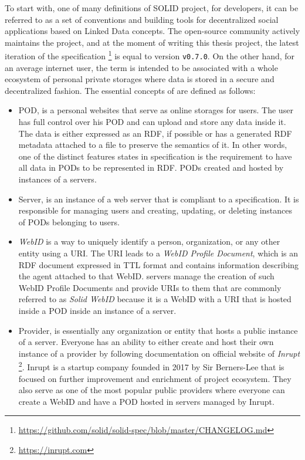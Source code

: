 To start with, one of many definitions of SOLID project, for developers, it can be referred to as a set of conventions and building tools for decentralized social applications based on Linked Data concepts. The open-source community actively maintains the project, and at the moment of writing this thesis project, the latest iteration of the specification \footnote{\url{https://github.com/solid/solid-spec/blob/master/CHANGELOG.md}} is equal to version \texttt{v0.7.0}. On the other hand, for an average internet user, the term \solid{} is intended to be associated with a whole ecosystem of personal private storages where data is stored in a secure and decentralized fashion. The essential concepts of \solid{} are defined as follows:
\begin{itemize}
    \item \solid{} \gls{POD}, is a personal websites  that serve as online storages  for users. The user has full control over his POD and can upload and store any data inside it. The data is either expressed as an RDF, if possible or has a generated RDF metadata attached to a file to preserve the semantics of it. In other words, one of the distinct features states in \solid{} specification is the requirement to have all data in PODs to be represented in RDF. PODs created and hosted by instances of a \solid{} servers.
    \item \solid{} Server, is an instance of a web server that is compliant to a \solid{} specification. It is responsible for managing users and creating, updating, or deleting instances of PODs belonging to users.
    \item \textit{WebID}  is a way to uniquely identify a person, organization, or any other entity using a URI. The URI leads to a \textit{WebID Profile Document}, which is an RDF document expressed in TTL format and contains information describing the agent attached to that WebID. \solid{} servers manage the creation of such WebID Profile Documents and provide URIs to them that are commonly referred to as \textit{Solid WebID} because it is a WebID with a URI that is hosted inside a POD inside an instance of a \solid{} server.
    \item \solid{} Provider, is essentially any organization or entity that hosts a public instance of a \solid{} server. Everyone has an ability to either create and host their own instance of a \solid{} provider  by following documentation on official website of \textit{Inrupt} \footnote{\url{https://inrupt.com}}. Inrupt is a startup company founded in 2017 by Sir Berners-Lee that is focused on further improvement and enrichment of \solid{} project ecosystem. They also serve as one of the most popular public \solid{} providers where everyone can create a WebID and have a POD hosted in \solid{} servers managed by Inrupt. 

\end{itemize}
